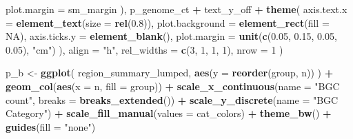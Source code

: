 \documentclass[
]{article}
\newenvironment{Shaded}{\begin{snugshade}}{\end{snugshade}}
\newcommand{\AttributeTok}[1]{\textcolor[rgb]{0.13,0.29,0.53}{#1}}
\newcommand{\ConstantTok}[1]{\textcolor[rgb]{0.56,0.35,0.01}{#1}}
\newcommand{\DecValTok}[1]{\textcolor[rgb]{0.00,0.00,0.81}{#1}}
\newcommand{\FloatTok}[1]{\textcolor[rgb]{0.00,0.00,0.81}{#1}}
\newcommand{\FunctionTok}[1]{\textcolor[rgb]{0.13,0.29,0.53}{\textbf{#1}}}
\newcommand{\NormalTok}[1]{#1}
\newcommand{\OtherTok}[1]{\textcolor[rgb]{0.56,0.35,0.01}{#1}}
\newcommand{\SpecialCharTok}[1]{\textcolor[rgb]{0.81,0.36,0.00}{\textbf{#1}}}
\newcommand{\StringTok}[1]{\textcolor[rgb]{0.31,0.60,0.02}{#1}}
\begin{document}
\begin{Shaded}
\begin{Highlighting}[]
    \AttributeTok{plot.margin =}\NormalTok{ sm\_margin}
\NormalTok{  ),}
\NormalTok{  p\_genome\_ct }\SpecialCharTok{+}\NormalTok{ text\_y\_off }\SpecialCharTok{+} \FunctionTok{theme}\NormalTok{(}
    \AttributeTok{axis.text.x =} \FunctionTok{element\_text}\NormalTok{(}\AttributeTok{size =} \FunctionTok{rel}\NormalTok{(}\FloatTok{0.8}\NormalTok{)),}
    \AttributeTok{plot.background =} \FunctionTok{element\_rect}\NormalTok{(}\AttributeTok{fill =} \ConstantTok{NA}\NormalTok{),}
    \AttributeTok{axis.ticks.y =} \FunctionTok{element\_blank}\NormalTok{(),}
    \AttributeTok{plot.margin =} \FunctionTok{unit}\NormalTok{(}\FunctionTok{c}\NormalTok{(}\FloatTok{0.05}\NormalTok{, }\FloatTok{0.15}\NormalTok{, }\FloatTok{0.05}\NormalTok{, }\FloatTok{0.05}\NormalTok{), }\StringTok{"cm"}\NormalTok{)}
\NormalTok{  ),}
  \AttributeTok{align =} \StringTok{"h"}\NormalTok{,}
  \AttributeTok{rel\_widths =} \FunctionTok{c}\NormalTok{(}\DecValTok{3}\NormalTok{, }\DecValTok{1}\NormalTok{, }\DecValTok{1}\NormalTok{, }\DecValTok{1}\NormalTok{),}
  \AttributeTok{nrow =} \DecValTok{1}
\NormalTok{)}

\NormalTok{p\_b }\OtherTok{\textless{}{-}} \FunctionTok{ggplot}\NormalTok{(}
\NormalTok{  region\_summary\_lumped,}
  \FunctionTok{aes}\NormalTok{(}\AttributeTok{y =} \FunctionTok{reorder}\NormalTok{(group, n))}
\NormalTok{) }\SpecialCharTok{+}
  \FunctionTok{geom\_col}\NormalTok{(}\FunctionTok{aes}\NormalTok{(}\AttributeTok{x =}\NormalTok{ n, }\AttributeTok{fill =}\NormalTok{ group)) }\SpecialCharTok{+}
  \FunctionTok{scale\_x\_continuous}\NormalTok{(}\AttributeTok{name =} \StringTok{"BGC count"}\NormalTok{, }\AttributeTok{breaks =} \FunctionTok{breaks\_extended}\NormalTok{()) }\SpecialCharTok{+}
  \FunctionTok{scale\_y\_discrete}\NormalTok{(}\AttributeTok{name =} \StringTok{"BGC Category"}\NormalTok{) }\SpecialCharTok{+}
  \FunctionTok{scale\_fill\_manual}\NormalTok{(}\AttributeTok{values =}\NormalTok{ cat\_colors) }\SpecialCharTok{+}
  \FunctionTok{theme\_bw}\NormalTok{() }\SpecialCharTok{+}
  \FunctionTok{guides}\NormalTok{(}\AttributeTok{fill =} \StringTok{"none"}\NormalTok{)}


\end{Highlighting}
\end{Shaded}
\end{document}
